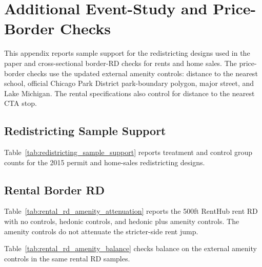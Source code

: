 \section{Additional Event-Study and Price-Border Checks}
\label{sec:appendix_event_study}

This appendix reports sample support for the redistricting designs used in the paper and cross-sectional border-RD checks for rents and home sales. The price-border checks use the updated external amenity controls: distance to the nearest school, official Chicago Park District park-boundary polygon, major street, and Lake Michigan. The rental specifications also control for distance to the nearest CTA stop.

\subsection{Redistricting Sample Support}

Table~\ref{tab:redistricting_sample_support} reports treatment and control group counts for the 2015 permit and home-sales redistricting designs.



\subsection{Rental Border RD}

Table~\ref{tab:rental_rd_amenity_attenuation} reports the 500ft RentHub rent RD with no controls, hedonic controls, and hedonic plus amenity controls. The amenity controls do not attenuate the stricter-side rent jump.

\begin{table}[H]
    \caption{RentHub RD: Hedonic and Amenity Controls}
    \label{tab:rental_rd_amenity_attenuation}

    
\end{table}

Table~\ref{tab:rental_rd_amenity_balance} checks balance on the external amenity controls in the same rental RD samples.

\begin{table}[H]
    \caption{RentHub RD: External Amenity Balance}
    \label{tab:rental_rd_amenity_balance}

    
\end{table}

